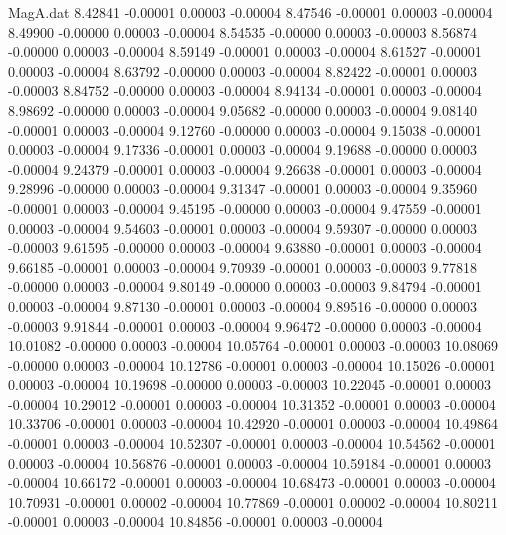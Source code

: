 \begin{filecontents}{MagA.dat}
   8.42841   -0.00001    0.00003   -0.00004
   8.47546   -0.00001    0.00003   -0.00004
   8.49900   -0.00000    0.00003   -0.00004
   8.54535   -0.00000    0.00003   -0.00003
   8.56874   -0.00000    0.00003   -0.00004
   8.59149   -0.00001    0.00003   -0.00004
   8.61527   -0.00001    0.00003   -0.00004
   8.63792   -0.00000    0.00003   -0.00004
   8.82422   -0.00001    0.00003   -0.00003
   8.84752   -0.00000    0.00003   -0.00004
   8.94134   -0.00001    0.00003   -0.00004
   8.98692   -0.00000    0.00003   -0.00004
   9.05682   -0.00000    0.00003   -0.00004
   9.08140   -0.00001    0.00003   -0.00004
   9.12760   -0.00000    0.00003   -0.00004
   9.15038   -0.00001    0.00003   -0.00004
   9.17336   -0.00001    0.00003   -0.00004
   9.19688   -0.00000    0.00003   -0.00004
   9.24379   -0.00001    0.00003   -0.00004
   9.26638   -0.00001    0.00003   -0.00004
   9.28996   -0.00000    0.00003   -0.00004
   9.31347   -0.00001    0.00003   -0.00004
   9.35960   -0.00001    0.00003   -0.00004
   9.45195   -0.00000    0.00003   -0.00004
   9.47559   -0.00001    0.00003   -0.00004
   9.54603   -0.00001    0.00003   -0.00004
   9.59307   -0.00000    0.00003   -0.00003
   9.61595   -0.00000    0.00003   -0.00004
   9.63880   -0.00001    0.00003   -0.00004
   9.66185   -0.00001    0.00003   -0.00004
   9.70939   -0.00001    0.00003   -0.00003
   9.77818   -0.00000    0.00003   -0.00004
   9.80149   -0.00000    0.00003   -0.00003
   9.84794   -0.00001    0.00003   -0.00004
   9.87130   -0.00001    0.00003   -0.00004
   9.89516   -0.00000    0.00003   -0.00003
   9.91844   -0.00001    0.00003   -0.00004
   9.96472   -0.00000    0.00003   -0.00004
  10.01082   -0.00000    0.00003   -0.00004
  10.05764   -0.00001    0.00003   -0.00003
  10.08069   -0.00000    0.00003   -0.00004
  10.12786   -0.00001    0.00003   -0.00004
  10.15026   -0.00001    0.00003   -0.00004
  10.19698   -0.00000    0.00003   -0.00003
  10.22045   -0.00001    0.00003   -0.00004
  10.29012   -0.00001    0.00003   -0.00004
  10.31352   -0.00001    0.00003   -0.00004
  10.33706   -0.00001    0.00003   -0.00004
  10.42920   -0.00001    0.00003   -0.00004
  10.49864   -0.00001    0.00003   -0.00004
  10.52307   -0.00001    0.00003   -0.00004
  10.54562   -0.00001    0.00003   -0.00004
  10.56876   -0.00001    0.00003   -0.00004
  10.59184   -0.00001    0.00003   -0.00004
  10.66172   -0.00001    0.00003   -0.00004
  10.68473   -0.00001    0.00003   -0.00004
  10.70931   -0.00001    0.00002   -0.00004
  10.77869   -0.00001    0.00002   -0.00004
  10.80211   -0.00001    0.00003   -0.00004
  10.84856   -0.00001    0.00003   -0.00004

\end{filecontents}
